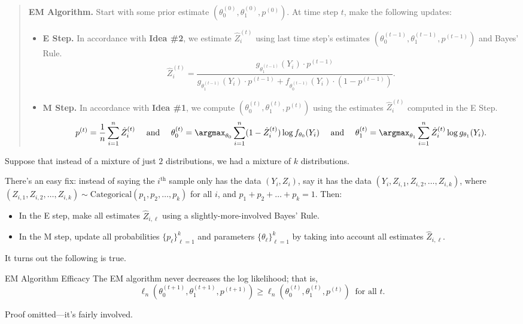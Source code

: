 \begin{quote}
    \textbf{EM Algorithm.} Start with some prior estimate
    $(\theta_0^{(0)}, \theta_1^{(0)}, p^{(0)})$.
    At time step $t$, make the following updates:
    \begin{itemize}
        \item \textbf{E Step.} In accordance with \textbf{Idea \#2},
        we estimate $\hat{Z}_i^{(t)}$ using last time step's estimates
        $(\theta_0^{(t - 1)}, \theta_1^{(t - 1)}, p^{(t - 1)})$
        and Bayes' Rule.
        \[ \hat{Z}_i^{(t)} = \frac{g_{\theta_1^{(t - 1)}}(Y_i) \cdot p^{(t - 1)}}{
            g_{\theta_1^{(t - 1)}}(Y_i) \cdot p^{(t - 1)} +
            f_{\theta_0^{(t - 1)}}(Y_i) \cdot (1 - p^{(t - 1)})
        }. \]
        \item \textbf{M Step.} In accordance with \textbf{Idea \#1},
        we compute $(\theta_0^{(t)}, \theta_1^{(t)}, p^{(t)})$
        using the estimates $\hat{Z}_i^{(t)}$ computed in the E Step.
        \[ p^{(t)} = \frac{1}{n} \sum_{i = 1}^n \hat{Z}_i^{(t)} ~~~ \text{ and } ~~~
        \theta_0^{(t)} = \argmax_{\theta_0} \sum_{i = 1}^n (1 - \hat{Z}_i^{(t)}) \log f_{\theta_0}(Y_i)
        ~~~ \text{ and } ~~~
        \theta_1^{(t)} = \argmax_{\theta_1} \sum_{i = 1}^n \hat{Z}_i^{(t)} \log g_{\theta_1}(Y_i). \]
    \end{itemize}
\end{quote}

\begin{remark}
    Suppose that instead of a mixture of just $2$ distributions,
    we had a mixture of $k$ distributions.

    There's an easy fix:
    instead of saying the $i^{\text{th}}$ sample only has the data $(Y_i, Z_i)$,
    say it has the data $(Y_i, Z_{i, 1}, Z_{i, 2}, \dots, Z_{i, k})$,
    where $(Z_{i, 1}, Z_{i, 2}, \dots, Z_{i, k}) \sim
    \mathrm{Categorical}(p_1, p_2, \dots, p_k)$ for all $i$,
    and $p_1 + p_2 + \dots + p_k = 1$.  Then:
    \begin{itemize}
        \item In the E step, make all estimates $\hat{Z}_{i, \ell}$
        using a slightly-more-involved Bayes' Rule.
        \item In the M step, update all probabilities $\{p_{\ell}\}_{\ell = 1}^k$
        and parameters $\{\theta_{\ell}\}_{\ell = 1}^k$
        by taking into account all estimates $\hat{Z}_{i, \ell}$.
    \end{itemize}
\end{remark}

It turns out the following is true.

\begin{theorem}{EM Algorithm Efficacy}
    The EM algorithm never decreases the log likelihood; that is,
    \[ \ell_n(\theta_0^{(t + 1)}, \theta_1^{(t + 1)}, p^{(t + 1)}) \geq
    \ell_n(\theta_0^{(t)}, \theta_1^{(t)}, p^{(t)}) ~ \text{ for all } t. \]
\end{theorem}

Proof omitted---it's fairly involved.

